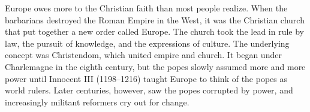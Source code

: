 
\begin{partsummary}
Europe owes more to the Christian faith than most people realize. When the barbarians destroyed the
Roman Empire in the West, it was the Christian church that put together a new order called Europe.
The church took the lead in rule by law, the pursuit of knowledge, and the expressions of culture.
The underlying concept was Christendom, which united empire and church. It began under Charlemagne
in the eighth century, but the popes slowly assumed more and more power until Innocent III
(1198–1216) taught Europe to think of the popes as world rulers. Later centuries, however, saw the
popes corrupted by power, and increasingly militant reformers cry out for change.
\end{partsummary}


